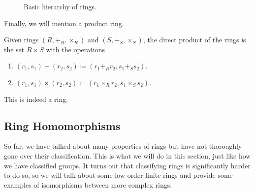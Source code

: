   \begin{figure}[H]
    \centering 
    \caption{Basic hierarchy of rings.} 
    \label{fig:ring_hierarchy}
  \end{figure} 

  Finally, we will mention a product ring. 

  \begin{definition}
    Given rings $(R, +_R, \times_R)$ and $(S, +_S, \times_S)$, the direct product of the rings is the set $R \times S$ with the operations 
    \begin{enumerate}
      \item $(r_1, s_1) + (r_2, s_2) \coloneqq (r_1 +_R r_2, s_1 +_S s_2)$. 
      \item $(r_1, s_1) \times (r_2, s_2) \coloneqq (r_1 \times_R r_2, s_1 \times_S s_2)$. 
    \end{enumerate}
    This is indeed a ring. 
  \end{definition}

\subsection{Ring Homomorphisms}

  So far, we have talked about many properties of rings but have not thoroughly gone over their classification. This is what we will do in this section, just like how we have classified groups. It turns out that classifying rings is significantly harder to do so, so we will talk about some low-order finite rings and provide some examples of isomorphisms between more complex rings. 

